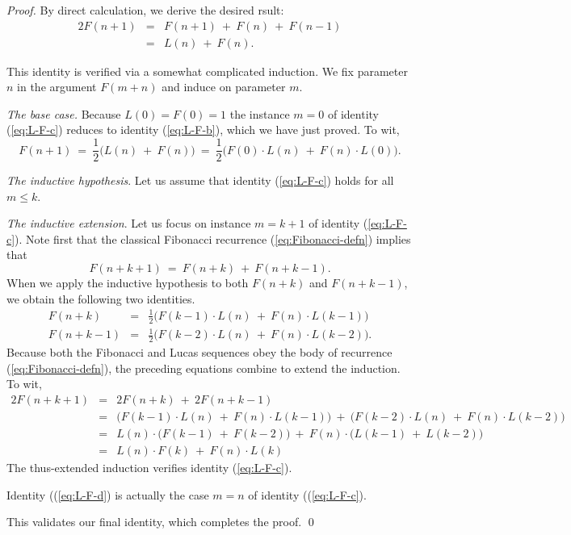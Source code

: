 \begin{proof}
\bigskip

By direct calculation, we derive the desired rsult:
\begin{eqnarray*}
2 F(n+1) & = & F(n+1) \ + \ F(n) \ + \ F(n-1) \\
         & = & L(n) \ + \ F(n).
\end{eqnarray*}

\bigskip

This identity is verified via a somewhat complicated induction.  We
fix parameter $n$ in the argument $F(m+n)$ and induce on parameter $m$.

\medskip

\noindent
{\it The base case.}
Because $L(0) = F(0)= 1$ the instance $m=0$ of identity
(\ref{eq:L-F-c}) reduces to identity (\ref{eq:L-F-b}), which we have
just proved.  To wit,
\[ F(n+1) \ = \ \frac{1}{2} \big( L(n) \ + \ F(n) \big)
\ = \ \frac{1}{2} \big( F(0) \cdot L(n) \ + \ F(n) \cdot L(0) \big).
\]

\medskip 

\noindent
{\it The inductive hypothesis}.
Let us assume that identity (\ref{eq:L-F-c}) holds for all $m \leq k$.

\medskip

\noindent
{\it The inductive extension}.
Let us focus on instance $m = k+1$ of identity (\ref{eq:L-F-c}).  Note
first that the classical Fibonacci recurrence
(\ref{eq:Fibonacci-defn}) implies that
\[ F(n + k +1) \ = \ F(n + k) \ + \ F(n + k - 1). \]
When we apply the inductive hypothesis to both $F(n + k)$ and $F(n + k
- 1)$, we obtain the following two identities.
\begin{eqnarray*}
F(n + k) & = & \frac{1}{2} \big( F(k-1) \cdot L(n) \ + \ F(n) \cdot
L(k-1) \big) \\
F(n + k - 1) & = & \frac{1}{2} \big( F(k-2) \cdot L(n) \ + \ F(n) \cdot L(k-2) \big).
\end{eqnarray*}
Because both the Fibonacci and Lucas sequences obey the body of
recurrence (\ref{eq:Fibonacci-defn}), the preceding equations combine
to extend the induction.  To wit,
\begin{eqnarray*}
2 F(n + k +1) & = & 2 F(n + k) \ + \ 2 F(n + k - 1) \\
              & = & 
\big( F(k-1) \cdot L(n) \ + \ F(n) \cdot L(k-1) \big)
\ + \
\big( F(k-2) \cdot L(n) \ + \ F(n) \cdot L(k-2) \big) \\
              & = &
L(n) \cdot \big( F(k-1) \ + \ F(k-2) \big)
\ + \
F(n) \cdot \big( L(k-1) \ + \ L(k-2) \big) \\
              & = &
L(n) \cdot F(k) \ + \ F(n) \cdot L(k)
\end{eqnarray*}
The thus-extended induction verifies identity (\ref{eq:L-F-c}).

\bigskip

Identity ((\ref{eq:L-F-d}) is actually the case $m=n$ of identity
((\ref{eq:L-F-c}).

This validates our final identity, which completes the proof.  \qed
\end{proof}


